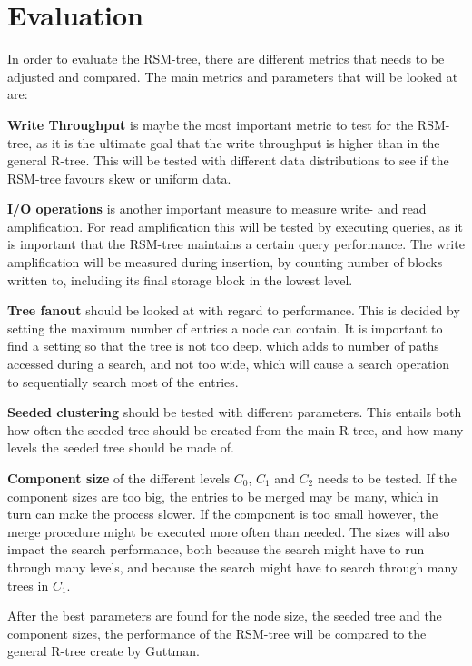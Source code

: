 \section{Evaluation}
In order to evaluate the RSM-tree, there are different metrics that needs to be adjusted and compared. The main metrics and parameters that will be looked at are:\newline

\noindent
\textbf{Write Throughput} is maybe the most important metric to test for the RSM-tree, as it is the ultimate goal that the write throughput is higher than in the general R-tree. This will be tested with different data distributions to see if the RSM-tree favours skew or uniform data. \newline

\noindent
\textbf{I/O operations} is another important measure to measure write- and read amplification. For read amplification this will be tested by executing queries, as it is important that the RSM-tree maintains a certain query performance. The write amplification will be measured during insertion, by counting number of blocks written to, including its final storage block in the lowest level. \newline

\noindent
\textbf{Tree fanout} should be looked at with regard to performance. This is decided by setting the maximum number of entries a node can contain. It is important to find a setting so that the tree is not too deep, which adds to number of paths accessed during a search, and not too wide, which will cause a search operation to sequentially search most of the entries. \newline

\noindent
\textbf{Seeded clustering} should be tested with different parameters. This entails both how often the seeded tree should be created from the main R-tree, and how many levels the seeded tree should be made of. \newline

\noindent
\textbf{Component size} of the different levels $C_0$, $C_1$ and $C_2$ needs to be tested. If the component sizes are too big, the entries to be merged may be many, which in turn can make the process slower. If the component is too small however, the merge procedure might be executed more often than needed. The sizes will also impact the search performance, both because the search might have to run through many levels, and because the search might have to search through many trees in $C_1$.\newline

\noindent
After the best parameters are found for the node size, the seeded tree and the component sizes, the performance of the RSM-tree will be compared to the general R-tree create by Guttman\cite{r-tree}. 